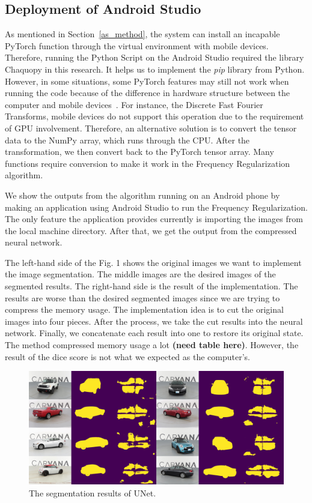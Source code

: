\documentclass[conference]{IEEEtran}
\begin{document}
\subsection{Deployment of Android Studio}
As mentioned in Section~\ref{as_method}, the system can install an incapable PyTorch function through the virtual environment with mobile devices. Therefore, running the Python Script on the Android Studio required the library Chaquopy in this research. It helps us to implement the \textit{pip} library from Python. However, in some situations, some PyTorch features may still not work when running the code because of the difference in hardware structure between the computer and mobile devices~\cite{cpuarch}. For instance, the Discrete Fast Fourier Transforms, mobile devices do not support this operation due to the requirement of GPU involvement. Therefore, an alternative solution is to convert the tensor data to the NumPy array, which runs through the CPU. After the transformation, we then convert back to the PyTorch tensor array. Many functions require conversion to make it work in the Frequency Regularization algorithm. 

We show the outputs from the algorithm running on an Android phone by making an application using Android Studio to run the Frequency Regularization. The only feature the application provides currently is importing the images from the local machine directory. After that, we get the output from the compressed neural network. 

The left-hand side of the Fig. 1 shows the original images we want to implement the image segmentation. The middle images are the desired images of the segmented results. The right-hand side is the result of the implementation. The results are worse than the desired segmented images since we are trying to compress the memory usage. The implementation idea is to cut the original images into four pieces. After the process, we take the cut results into the neural network. Finally, we concatenate each result into one to restore its original state. The method compressed memory usage a lot \textbf{(need table here)}. However, the result of the dice score is not what we expected as the computer's.  

\begin{figure}[htbp]
	\centering
	\includegraphics[width=1\linewidth]{figures/mobile_seg.png}
	\caption{The segmentation results of UNet.}
\end{figure}
\end{document}
